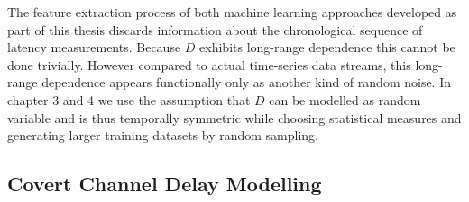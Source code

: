 \documentclass[12pt,a4paper,automark, toc=bib]{scrreprt}
\theoremstyle{definition}
\begin{document}
			The feature extraction process of both machine learning approaches developed as part of this thesis discards information about the chronological sequence of latency measurements. Because $D$ exhibits long-range dependence this cannot be done trivially. However compared to actual time-series data streams, this long-range dependence appears functionally only as another kind of random noise. In chapter 3 and 4 we use the assumption that $D$ can be modelled as random variable and is thus temporally symmetric while choosing statistical measures and generating larger training datasets by random sampling.
			\label{network-lat}
			
			
			\subsection{Covert Channel Delay Modelling}
			
\end{document}
